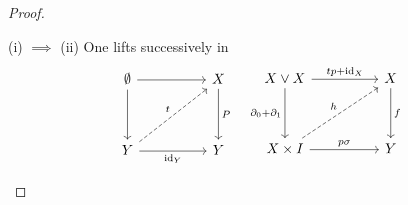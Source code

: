 \documentclass[../main]{subfiles}
\begin{document}
\begin{proof}\phantom{}
\begin{implyenumerate}
    \item[(i) $\implies$ (ii)]  One lifts successively in
\begin{equation*}
    \begin{tikzcd}
    \emptyset \arrow[dd] \arrow[rr]                  &  & X \arrow[dd, "P"] \\
                                                     &  &                   \\
    Y \arrow[rr, "\id_Y"'] \arrow[rruu, "t", dashed] &  & Y                
    \end{tikzcd}
    \quad 
    \begin{tikzcd}
    X \vee X \arrow[dd, "\partial_0+\partial_1"'] \arrow[rr, "tp+\id_X"] &  & X \arrow[dd, "f"] \\
                                                                         &  &                   \\
    X\times I \arrow[rr, "p\sigma"] \arrow[rruu, "h", dashed]            &  & Y                
    \end{tikzcd}
\end{equation*}
    

\end{implyenumerate}
\end{proof}
\end{document}
